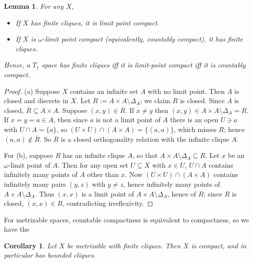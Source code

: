 \documentclass[12pt]{article}
\theoremstyle{plain}
\newtheorem{lemma}{Lemma}
\newtheorem{corollary}{Corollary}
\theoremstyle{definition}
\theoremstyle{remark}
\begin{document}
\begin{lemma}\label{finitecc} For any $X$, 
\begin{itemize} 
\item[(a)] If $X$ has finite cliques, it is limit point compact. 
\item[(b)] If $X$ is $\omega$-limit point compact (equivalently, countably compact), it has finite cliques.
\end{itemize} 
\vspace{-.1in}
Hence, a $T_1$ space has finite cliques iff it is 
limit-point compact iff it is countably compact. 
\end{lemma}

\begin{proof}
(a) Suppose $X$ contains an infinite set $A$ with no limit point. Then $A$ is closed and discrete in $X$. Let $R := A \times A \setminus \Delta_{A}$; we claim $R$ is closed. Since $A$ is closed, $\overline{R} \subseteq A \times A$. Suppose $(x,y) \in \overline{R}$. If $x \neq y$ then $(x,y) \in A \times A \setminus \Delta_A = R$. If $x = y = a \in A$, then since $a$ is not a limit point of $A$ there is an open $U \ni a$ with $U \cap A = \{a\}$, so $(U \times U) \cap (A \times A) = \{(a,a)\}$, which misses $R$; hence $(a,a) \notin \overline{R}$. So $R$ is a closed orthogonality relation with the infinite clique $A$. 

For (b), suppose $R$ has an infinite clique $A$, so that $A \times A \setminus \Delta_{A} \subseteq R$. Let $x$ be an $\omega$-limit point of $A$. Then for any open set $U \subseteq X$ with $x \in U$, $U \cap A$ contains infinitely many points of $A$ other than $x$.  
Now $(U \times U) \cap (A \times A)$ contains infinitely many pairs $(y,z)$ with $y \neq z$, hence infinitely many points of $A \times A \setminus \Delta_{A}$. Thus $(x,x)$ is a limit point of $A \times A \setminus \Delta_{A}$, hence of $R$; since $R$ is closed, $(x,x) \in R$, contradicting irreflexivity.
\end{proof}

For metrizable spaces, countable compactness is equivalent to compactness, so we have the

\begin{corollary}\label{metrizable}
Let $X$ be metrizable with finite cliques. Then $X$ is compact, and in particular has bounded cliques.
\end{corollary}
\end{document}
